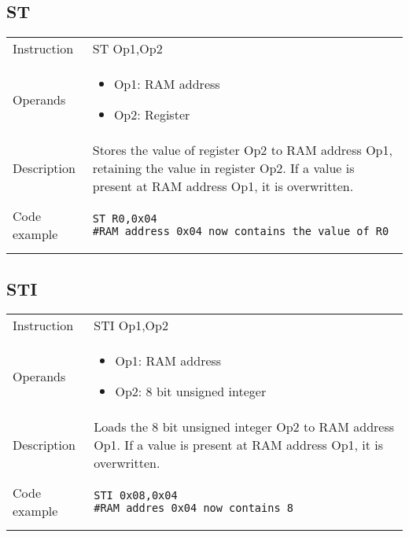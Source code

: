 \newpage

\subsection{ST}
\renewcommand*{\arraystretch}{2.0}
\begin{longtable}{P{3cm}P{9cm}}
\midrule
\noindent Instruction & ST Op1,Op2 \\
\noindent Operands &
\begin{itemize}[label={},noitemsep,leftmargin=*,topsep=0pt,partopsep=0pt, itemsep=1em]
\item Op1: RAM address
\item Op2: Register
\end{itemize}\\
\noindent Description & Stores the value of register Op2 to RAM address Op1, retaining the value in register Op2. If a value is present at RAM address Op1, it is overwritten.
	 \\
\noindent Code example & 
\begin{lstlisting}
ST R0,0x04
#RAM address 0x04 now contains the value of R0
\end{lstlisting} \\
\end{longtable}


\subsection{STI}
\renewcommand*{\arraystretch}{2.0}
\begin{longtable}{P{3cm}P{9cm}}
\midrule
\noindent Instruction & STI Op1,Op2 \\
\noindent Operands &
\begin{itemize}[label={},noitemsep,leftmargin=*,topsep=0pt,partopsep=0pt, itemsep=1em]
\item Op1: RAM address
\item Op2: 8 bit unsigned integer
\end{itemize}\\
\noindent Description & Loads the 8 bit unsigned integer Op2 to RAM address Op1. If a value is present at RAM address Op1, it is overwritten.
	 \\
\noindent Code example & 
\begin{lstlisting}
STI 0x08,0x04
#RAM addres 0x04 now contains 8
\end{lstlisting} \\
\end{longtable}

